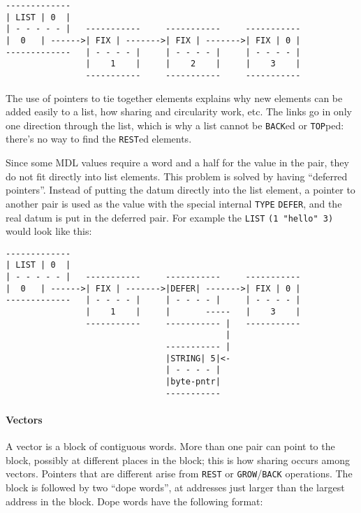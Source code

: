 \documentclass[a4paper,]{article}
\let\oldparagraph\paragraph
\renewcommand{\paragraph}[1]{\oldparagraph{#1}\mbox{}}
\begin{document}
\begin{verbatim}
-------------
| LIST | 0  |
| - - - - - |   -----------     -----------     -----------
|  0   | ------>| FIX | ------->| FIX | ------->| FIX | 0 |
-------------   | - - - - |     | - - - - |     | - - - - |
                |    1    |     |    2    |     |    3    |
                -----------     -----------     -----------
\end{verbatim}

The use of pointers to tie together elements explains why new elements can be added easily to a list, how sharing and
circularity work, etc. The links go in only one direction through the list, which is why a list cannot be
\texttt{BACK}ed or \texttt{TOP}ped: there's no way to find the
\texttt{REST}ed elements.

Since some MDL values require a word and a half for the value in the pair, they do not fit directly into list elements.
This problem is solved by having ``deferred pointers''. Instead of putting the datum directly into the list element, a
pointer to another pair is used as the value with the special internal \texttt{TYPE} \texttt{DEFER}, and the real datum is
put in the deferred pair. For example the \texttt{LIST} \texttt{(1\ "hello"\ 3)} would look like this:

\begin{verbatim}
-------------
| LIST | 0  |
| - - - - - |   -----------     -----------     -----------
|  0   | ------>| FIX | ------->|DEFER| ------->| FIX | 0 |
-------------   | - - - - |     | - - - - |     | - - - - |
                |    1    |     |       -----   |    3    |
                -----------     ----------- |   -----------
                                            |
                                ----------- |
                                |STRING| 5|<-
                                | - - - - |
                                |byte-pntr|
                                -----------
\end{verbatim}

\paragraph{Vectors}\label{vectors}

A vector is a block of contiguous words. More than one pair can point to the block, possibly at different places in the
block; this is how sharing occurs among vectors. Pointers that are different arise from \texttt{REST} or
\texttt{GROW}/\texttt{BACK} operations. The block is followed by two ``dope words'', at addresses just larger than the
largest address in the block. Dope words have the following format:
\end{document}
